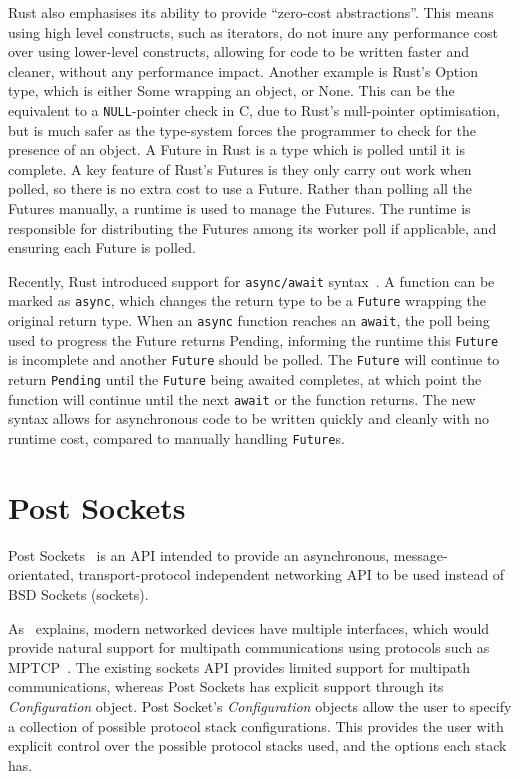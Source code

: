 Rust also emphasises its ability to provide “zero-cost abstractions”.
This means using high level constructs, such as iterators, do not inure any performance cost over using lower-level
constructs, allowing for code to be written faster and cleaner, without any performance impact.
Another example is Rust's Option type, which is either Some wrapping an object, or None.
This can be the equivalent to a \texttt{NULL}-pointer check in C, due to Rust's null-pointer optimisation, but is much
safer as the type-system forces the programmer to check for the presence of an object.
A Future in Rust is a type which is polled until it is complete.
A key feature of Rust's Futures is they only carry out work when polled, so there is no extra cost to use a Future.
Rather than polling all the Futures manually, a runtime is used to manage the Futures.
The runtime is responsible for distributing the Futures among its worker poll if applicable, and ensuring each Future is
polled.

Recently, Rust introduced support for \texttt{async/await} syntax~\citep{withoutboats_asyncawaitnotation_}.
A function can be marked as \texttt{async}, which changes the return type to be a \texttt{Future} wrapping the original
return type.
When an \texttt{async} function reaches an \texttt{await}, the poll being used to progress the Future returns Pending,
informing the runtime this \texttt{Future} is incomplete and another \texttt{Future} should be polled.
The \texttt{Future} will continue to return \texttt{Pending} until the \texttt{Future} being awaited completes,
at which point the function will continue until the next \texttt{await} or the function returns.
The new syntax allows for asynchronous code to be written quickly and cleanly with no runtime cost, compared to manually
handling \texttt{Future}s.

\section{Post Sockets}\label{sec:post-sockets}
Post Sockets~\citep{kuhlewind_postsocketsabstract_} is an API intended to provide an asynchronous, message-orientated,
transport-protocol independent networking API to be used instead of BSD Sockets (sockets).

As~\cite{kuhlewind_postsocketsabstract_} explains, modern networked devices have multiple interfaces, which would
provide natural support for multipath communications using protocols such as
MPTCP~\citep{handley_tcpextensionsmultipath_}.
The existing sockets API provides limited support for multipath communications, whereas Post Sockets has explicit
support through its \emph{Configuration} object.
Post Socket's \emph{Configuration} objects allow the user to specify a collection of possible protocol stack
configurations.
This provides the user with explicit control over the possible protocol stacks used, and the options each stack has.

